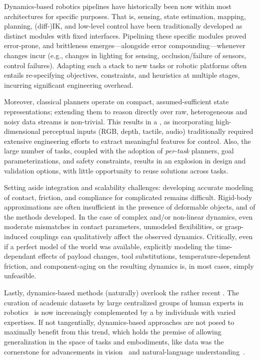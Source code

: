 Dynamics-based robotics pipelines have historically been  now within most architectures for specific purposes.
That is, sensing, state estimation, mapping, planning, (diff-)IK, and low-level control have been traditionally developed as distinct modules with fixed interfaces.
Pipelining these specific modules proved error-prone, and brittleness emerges---alongside error compounding---whenever changes incur (e.g., changes in lighting for sensing, occlusion/failure of sensors, control failures).
Adapting such a stack to new tasks or robotic platforms often entails re-specifying objectives, constraints, and heuristics at multiple stages, incurring significant engineering overhead.

Moreover, classical planners operate on compact, assumed-sufficient state representations; extending them to reason directly over raw, heterogeneous and noisy data streams is non-trivial.
This results in a , as incorporating high-dimensional perceptual inputs (RGB, depth, tactile, audio) traditionally required extensive engineering efforts to extract meaningful features for control. 
Also, the large number of tasks, coupled with the adoption of \emph{per-task} planners, goal parameterizations, and safety constraints, results in an explosion in design and validation options, with little opportunity to reuse solutions across tasks.

Setting aside integration and scalability challenges: developing accurate modeling of contact, friction, and compliance for complicated remains difficult.
Rigid-body approximations are often insufficient in the presence of deformable objects, and  of the methods developed.
In the case of complex and/or non-linear dynamics, even moderate mismatches in contact parameters, unmodeled flexibilities, or grasp-induced couplings can qualitatively affect the observed dynamics.
Critically, even if a perfect model of the world was available, explicitly modeling the time-dependant effects of payload changes, tool substitutions, temperature-dependent friction, and component-aging on the resulting dynamics is, in most cases, simply unfeasible.

Lastly, dynamics-based methods (naturally) overlook the rather recent . 
The curation of academic datasets by large centralized groups of human experts in robotics~\citep{OpenXEmbodimentRobotic,DROIDLargeScaleIntheWild,agibot-world-contributorsAgiBotWorldColosseo2025} is now increasingly complemented by a  by individuals with varied expertises.
If not tangentially, dynamics-based approaches are not posed to maximally benefit from this trend, which holds the premise of allowing generalization in the space of tasks and embodiments, like data was the cornerstone for advancements in vision~\citep{alayracFlamingoVisualLanguage2022} and natural-language understanding~\citep{brownLanguageModelsAre2020}.

